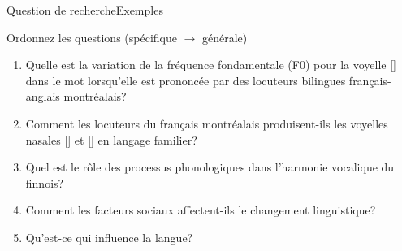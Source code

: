 \documentclass[xcolor=dvipsnames, mathserif, 10pt, aspectratio=169, handout]{beamer}
\begin{document}

\begin{frame}[t]{Question de recherche}{Exemples}


\begin{importanttitle}{Ordonnez les questions (spécifique $\rightarrow$ générale)}
	

\begin{enumerate}
    
    \item[B.] Quelle est la variation de la fréquence fondamentale (F0) pour la voyelle [] dans le mot  lorsqu'elle est prononcée par des locuteurs bilingues français-anglais montréalais?
    
    \item[A.] Comment les locuteurs du français montréalais produisent-ils les voyelles nasales [] et [] en langage familier?
    
    
    \item[D.] Quel est le rôle des processus phonologiques dans l'harmonie vocalique du finnois?

    \item[E.] Comment les facteurs sociaux affectent-ils le changement linguistique?
    
    \item[C.] Qu'est-ce qui influence la langue?
\end{enumerate}
\end{importanttitle}

	
\end{frame}

\end{document}
